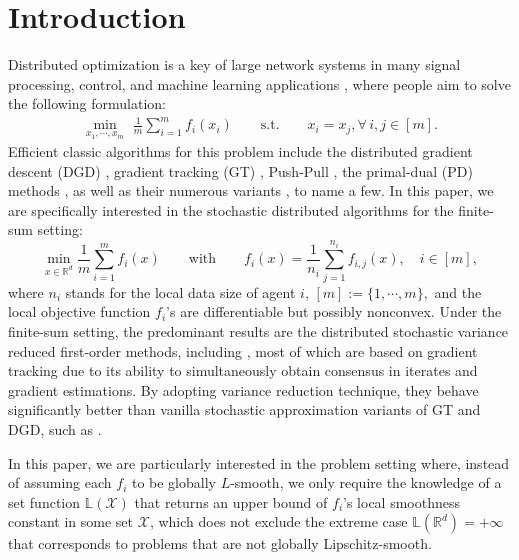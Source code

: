 \documentclass{article}
\newcommand{\cX}{\mathcal{X}}
\newcommand{\bL}{\mathbb{L}}
\newcommand{\RR}{\mathbb{R}}
\newcommand{\st}{\mathrm{s.t.}}
\newcommand{\fij}{f_{i,j}}
\begin{document}
\section{Introduction}
\label{section:Intro}
Distributed optimization is a key of large network systems in many signal processing, control, and machine learning applications \cite{nedic2017achieving,olfati2007consensus,chen2012diffusion,ling2012decentralized}, where people aim to solve the following formulation: 
\begin{eqnarray}
    \label{prob:consensus}
    \min_{x_1,\cdots,x_m}\,\, \frac{1}{m}\sum_{i=1}^{m} f_i(x_i)\qquad \st \qquad x_i = x_j, \forall\, i,j\in[m].
\end{eqnarray}
Efficient classic algorithms for this problem include the distributed gradient descent (DGD)   \cite{nedic2009distributed,nedic10distributed,yuan2016convergence,zeng2018nonconvex}, gradient tracking (GT)  \cite{nedic2017achieving,pu2021distributed,koloskova2021improved}, Push-Pull \cite{nedic2009distributed,li2019decentralized,shi2015extra,qu2017harnessing}, the primal-dual (PD) methods \cite{pesquet2014class,zhang2017distributed}, as well as their numerous  variants \cite{shi2015extra,hong2017prox,tang2018d,lu2019gnsd,sun2019distributed,xin2020general,pu2021distributed,sun2022distributed}, to name a few.  In this paper, we are specifically interested in the stochastic distributed algorithms for the finite-sum setting: 
\begin{equation}
    \label{prob:main}
    \min_{x\in\RR^d} \frac{1}{m}\sum_{i=1}^m f_i(x)\qquad\mbox{with}\qquad f_i(x) = \frac{1}{n_i}\sum_{j=1}^{n_i} \fij(x), \quad i\in[m], 
\end{equation}
where $n_i$ stands for the local data size of agent $i$, $[m]:=\{1,\cdots,m\},$ and the local objective function $f_i$'s are differentiable but possibly nonconvex.
Under the finite-sum setting, the predominant results are the distributed stochastic variance reduced first-order methods, including \cite[etc.]{sun2020improving,xin2020general,xin2020variance,xin2020near,xin2021fast,jiang2022distributed}, most of which are based on gradient tracking due to its ability to simultaneously obtain consensus in iterates and gradient estimations. By adopting variance reduction technique, they behave significantly better than vanilla stochastic approximation variants of GT and DGD, such as \cite{tang2018d,lu2019gnsd,pu2021distributed}.





In this paper, we are particularly interested in the problem setting where, instead of assuming each $f_i$ to be globally $L$-smooth, we only require the knowledge of a set function $\bL(\cX)$ that returns an upper bound of $f_i$'s local smoothness constant in some set $\cX$, which does not exclude the extreme case $\bL(\mathbb{R}^d)=+\infty$ that corresponds to problems that are not globally Lipschitz-smooth.
\end{document}
